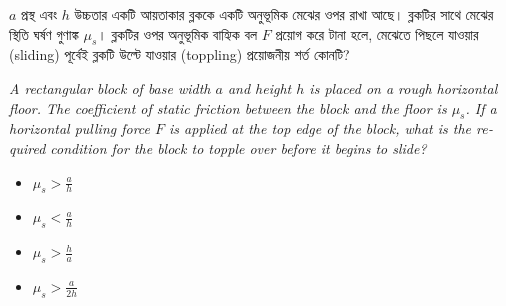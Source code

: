 \documentclass[12pt, a4paper]{article}
\begin{document}
\newpage

\begin{tcolorbox}[questionbox={প্রশ্ন (Question) 49}]
    \noindent
    $a$ প্রস্থ এবং $h$ উচ্চতার একটি আয়তাকার ব্লককে একটি অনুভূমিক মেঝের ওপর রাখা আছে। ব্লকটির সাথে মেঝের স্থিতি ঘর্ষণ গুণাঙ্ক $\mu_s$। ব্লকটির ওপর অনুভূমিক বাহ্যিক বল $F$ প্রয়োগ করে টানা হলে, মেঝেতে পিছলে যাওয়ার (sliding) পূর্বেই ব্লকটি উল্টে যাওয়ার (toppling) প্রয়োজনীয় শর্ত কোনটি?
    
    \vspace{0.8em}
    \begin{english}
    \noindent\textit{\color{darkgray}
    A rectangular block of base width $a$ and height $h$ is placed on a rough horizontal floor. The coefficient of static friction between the block and the floor is $\mu_s$. If a horizontal pulling force $F$ is applied at the top edge of the block, what is the required condition for the block to topple over before it begins to slide?
    }
    \end{english}
\end{tcolorbox}

\vspace{1em}
\begin{center}
\end{center}
\vspace{1em}

\begin{itemize}[label={}, leftmargin=1cm, itemsep=0.5em]
    \item[\textbf{A)}] $\mu_s > \frac{a}{h}$
    \item[\textbf{B)}] $\mu_s < \frac{a}{h}$
    \item[\textbf{C)}] $\mu_s > \frac{h}{a}$
    \item[\textbf{D)}] $\mu_s > \frac{a}{2h}$
\end{itemize}
\end{document}

